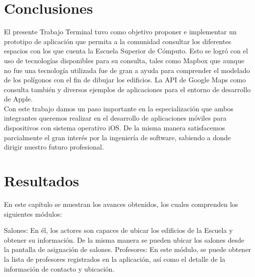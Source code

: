 \section{Conclusiones}

El presente Trabajo Terminal tuvo como objetivo proponer e implementar un prototipo de aplicación que permita a la comunidad consultar los diferentes espacios con los que cuenta la Escuela Superior de Cómputo. Esto se logró con el uso de tecnologías disponibles para su consulta, tales como Mapbox que aunque no fue una tecnología utilizada fue de gran a ayuda para comprender el modelado de los polígonos con el fin de dibujar los edificios. La API de Google Maps como consulta también y diversos ejemplos de aplicaciones para el entorno de desarrollo de Apple.\\

Con este trabajo damos un paso importante en la especialización que ambos integrantes queremos realizar en el desarrollo de aplicaciones móviles para dispositivos con sistema operativo iOS. De la misma manera satisfacemos parcialmente el gran interés por la ingeniería de software, sabiendo a donde dirigir nuestro futuro profesional.

\section{Resultados}

En este capítulo se muestran los avances obtenidos, los cuales comprenden los siguientes módulos:\\

\begin{UClist} 
	\UCli Salones: En él, los actores son capaces de ubicar los edificios de la Escuela y obtener su información. De la misma manera se pueden ubicar los salones desde la pantalla de asignación de salones.
	\UCli Profesores: En este módulo, se puede obtener la lista de profesores registrados en la aplicación, así como el detalle de la información de contacto y ubicación.
\end{UClist} 

%
%
%
%

